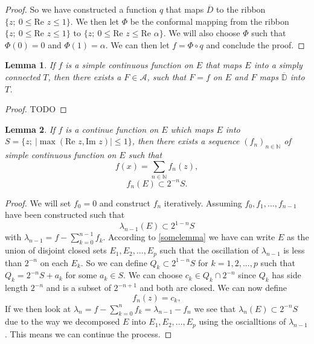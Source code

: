 \documentclass[a4paper,12pt,twoside,BCOR=10mm]{scrbook}
\newtheorem{lemma}{Lemma}
\renewcommand{\Re}{\text{Re }}
\renewcommand{\Im}{\text{Im }}
\begin{document}
\begin{proof}
So we have constructed a function $q$ that maps $\overline{D}$ to the ribbon $\{z;\ 0 \leq \Re z \leq 1\}$.
We then let $\Phi$ be the conformal mapping from the ribbon $\{z;\ 0 \leq \Re z \leq 1\}$ to $\{z;\ 0 \leq \Re z \leq \Re \alpha\}$. %
We will also choose $\Phi$ such that $\Phi(0) = 0$ and $\Phi(1) = \alpha$.
We can then let $f = \Phi \circ q$ and conclude the proof.

\end{proof}
\begin{lemma}
If $f$ is a simple continuous function on $E$ that maps $E$ into a simply connected $T$, then there exists a $F \in \mathcal{A}$, such that $F = f$ on $E$ and $F$ maps $\overline{\mathbb{D}}$ into $T$.
\end{lemma}
\begin{proof}
TODO
\end{proof}
\begin{lemma}
If $f$ is a continue function on $E$ which maps $E$ into $S = \{z;\ |\max(\Re z, \Im z)| \leq 1\}$, then there exists a sequence $(f_n)_{n \in \mathbb{N}}$ of simple continuous function on $E$ such that
\[
	f(x) = \sum_{n \in \mathbb{N}} f_n(z),
\]
\[
	f_n(E) \subset 2^{-n}S.
\]
\end{lemma}
\begin{proof}
We will set $f_0 = 0$ and construct $f_n$ iteratively.
Assuming $f_0, f_1, ..., f_{n - 1}$ have been constructed such that
\[
	\lambda_{n - 1}(E) \subset 2^{1 - n}S
\]
with $\lambda_{n - 1} = f - \sum_{k = 0}^{n - 1}f_k$.
According to \ref{somelemma} we have can write $E$ as the union of disjoint closed sets $E_1, E_2, ..., E_p$ such that the oscillation of $\lambda_{n - 1}$ is less than $2^{-n}$ on each $E_k$. %
So we can define $Q_k \subset 2^{1 - n}S$ for $k = 1, 2, ..., p$ such that $Q_k = 2^{-n}S + a_k$ for some $a_k \in S$.
We can choose $c_k \in Q_k \cap 2^{-n}$ since $Q_k$ has side length $2^{-n}$ and is a subset of $2^{-n + 1}$ and both are closed.
We can now define
\[
	f_n(z) = c_k, \tag*{$z \in E_k,\ k = 1, 2, ..., p$.}
\]
If we then look at $\lambda_n = f - \sum_{k = 0}^nf_k = \lambda_{n - 1} - f_n$ we see that $\lambda_n(E) \subset 2^{-n}S$ due to the way we decomposed $E$ into $E_1, E_2, ..., E_p$ using the oscialltions of $\lambda_{n - 1}$.
This means we can continue the process.
\end{proof}
\end{document}

